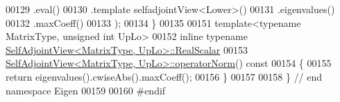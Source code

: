 \begin{DoxyCode}
00129                  .eval()
00130          .template selfadjointView<Lower>()
00131          .eigenvalues()
00132          .maxCoeff()
00133          );
00134 \}
00135 
00151 \textcolor{keyword}{template}<\textcolor{keyword}{typename} MatrixType, \textcolor{keywordtype}{unsigned} \textcolor{keywordtype}{int} UpLo>
00152 \textcolor{keyword}{inline} \textcolor{keyword}{typename} \hyperlink{group___core___module_af9f0234ebeae4c4ca512bcd5fb5e8bb1}{SelfAdjointView<MatrixType, UpLo>::RealScalar}
00153 \hyperlink{group___core___module_a12a7da482e31ec9c517dca92dd7bae61}{SelfAdjointView<MatrixType, UpLo>::operatorNorm}()\textcolor{keyword}{ const}
00154 \textcolor{keyword}{}\{
00155   \textcolor{keywordflow}{return} eigenvalues().cwiseAbs().maxCoeff();
00156 \}
00157 
00158 \} \textcolor{comment}{// end namespace Eigen}
00159 
00160 \textcolor{preprocessor}{#endif}
\end{DoxyCode}
